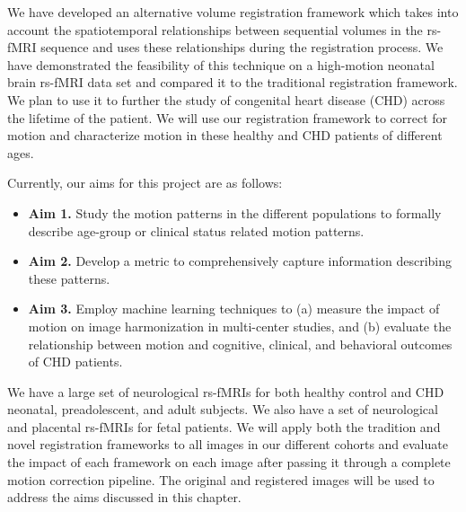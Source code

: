 We have developed an alternative volume registration framework which takes into account the spatiotemporal relationships between sequential volumes in the rs-fMRI sequence and uses these relationships during the registration process. We have demonstrated the feasibility of this technique on a high-motion neonatal brain rs-fMRI data set and compared it to the traditional registration framework. We plan to use it to further the study of congenital heart disease (CHD) across the lifetime of the patient. We will use our registration framework to correct for motion and characterize motion in these healthy and CHD patients of different ages.

Currently, our aims for this project are as follows:
\begin{itemize}
\item \textbf{Aim 1.} Study the motion patterns in the different populations to formally describe age-group or clinical status related motion patterns.
\item \textbf{Aim 2.} Develop a metric to comprehensively capture information describing these patterns.
\item \textbf{Aim 3.} Employ machine learning techniques to (a) measure the impact of motion on image harmonization in multi-center studies, and (b) evaluate the relationship between motion and cognitive, clinical, and behavioral outcomes of CHD patients.
\end{itemize}


We have a large set of neurological rs-fMRIs for both healthy control and CHD neonatal, preadolescent, and adult subjects. We also have a set of neurological and placental rs-fMRIs for fetal patients. We will apply both the tradition and novel registration frameworks to all images in our different cohorts and evaluate the impact of each framework on each image after passing it through a complete motion correction pipeline. The original and registered images will be used to address the aims discussed in this chapter.